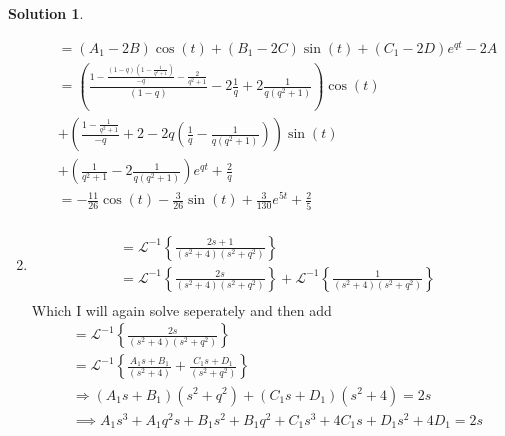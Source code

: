 \documentclass[10pt]{article}
\theoremstyle{definition}
\newtheorem{soln}{Solution}
\newcommand{\laplace}{\mathcal{L}}
\begin{document}
\begin{soln}
\begin{enumerate}[label=(\alph*)]
\begin{align*}
             & =\left(A_1-2B\right)\cos\left(t\right)+\left(B_1-2C\right)\sin\left(t\right)+\left(C_1-2D\right)e^{qt}-2A                                                                    \\
             & =
            \left(\frac{1-\frac{\left(1-q\right)\left(1-\frac{1}{q^2+1}\right)}{-q}-\frac{2}{q^2+1}}{\left(1-q\right)}-2\frac{1}{q}+2\frac{1}{q\left(q^2+1\right)}\right)\cos\left(t\right) \\
             & +\left(\frac{1-\frac{1}{q^2+1}}{-q}+2-2q\left(\frac{1}{q}-\frac{1}{q\left(q^2+1\right)}\right)\right)\sin\left(t\right)                                                      \\
             & +\left(\frac{1}{q^2+1}-2\frac{1}{q\left(q^2+1\right)}\right)e^{qt}+\frac{2}{q}                                                                                               \\
             & = -\frac{11}{26}\cos\left(t\right)-\frac{3}{26}\sin\left(t\right)+\frac{3}{130}e^{5t}+\frac{2}{5}                                                                            \\
          \end{align*}
    \item \begin{align*}
             & =\laplace^{-1}\left\{\frac{2s+1}{\left(s^2+4\right)\left(s^2+q^2\right)}\right\}                                                                            \\
             & =\laplace^{-1}\left\{\frac{2s}{\left(s^2+4\right)\left(s^2+q^2\right)}\right\}+\laplace^{-1}\left\{\frac{1}{\left(s^2+4\right)\left(s^2+q^2\right)}\right\} \\
          \end{align*}
          Which I will again solve seperately and then add
          \begin{align*}
             & = \laplace^{-1}\left\{\frac{2s}{\left(s^2+4\right)\left(s^2+q^2\right)}\right\}                        \\
             & = \laplace^{-1}\left\{\frac{A_1s+B_1}{\left(s^2+4\right)}+\frac{C_1s+D_1}{\left(s^2+q^2\right)}\right\} \\
             & \Rightarrow \left(A_1s+B_1\right)\left(s^2+q^2\right) + \left(C_1s+D_1\right)\left(s^2+4\right)=2s     \\
             & \implies A_1s^3+A_1q^2s+B_1s^2+B_1q^2+C_1s^3+4C_1s+D_1s^2+4D_1=2s                                      \\

\end{align*}
\end{enumerate}
\end{soln}
\end{document}
